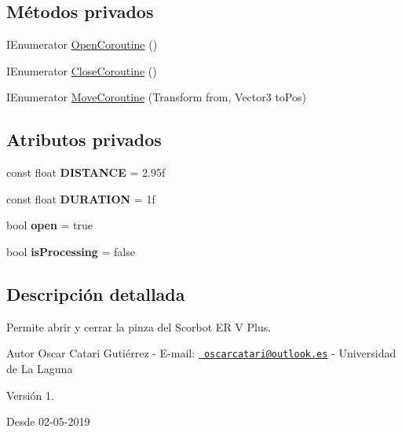 \subsection*{Métodos privados}
\begin{DoxyCompactItemize}
\item 
I\+Enumerator \mbox{\hyperlink{class_grip_scorbot_e_r_v_plus_a80dc2479b382451c0a41893e64287382}{Open\+Coroutine}} ()
\item 
I\+Enumerator \mbox{\hyperlink{class_grip_scorbot_e_r_v_plus_acc36be3cd433bc005835c85aa9c6aa8f}{Close\+Coroutine}} ()
\item 
I\+Enumerator \mbox{\hyperlink{class_grip_scorbot_e_r_v_plus_aa15864ac05d2aaa60844cb715def5b35}{Move\+Coroutine}} (Transform from, Vector3 to\+Pos)
\end{DoxyCompactItemize}
\subsection*{Atributos privados}
\begin{DoxyCompactItemize}
\item 
\mbox{\label{class_grip_scorbot_e_r_v_plus_a4669b7e065bd3a55fed035eecdc0f7a8}} 
const float {\bfseries D\+I\+S\+T\+A\+N\+CE} = 2.\+95f
\item 
\mbox{\label{class_grip_scorbot_e_r_v_plus_a6a4ad71a31f63313d466f9c5d2b57108}} 
const float {\bfseries D\+U\+R\+A\+T\+I\+ON} = 1f
\item 
\mbox{\label{class_grip_scorbot_e_r_v_plus_aa6e923c5df19200ce3935ad8ead89547}} 
bool {\bfseries open} = true
\item 
\mbox{\label{class_grip_scorbot_e_r_v_plus_ad1c090ff1a691904389e10fe03446cbd}} 
bool {\bfseries is\+Processing} = false
\end{DoxyCompactItemize}


\subsection{Descripción detallada}
Permite abrir y cerrar la pinza del Scorbot ER V Plus. \begin{DoxyAuthor}{Autor}
Oscar Catari Gutiérrez -\/ E-\/mail\+: \href{mailto:oscarcatari@outlook.es}{\texttt{ oscarcatari@outlook.\+es}} -\/ Universidad de La Laguna 
\end{DoxyAuthor}
\begin{DoxyVersion}{Versión}
1. 
\end{DoxyVersion}
\begin{DoxySince}{Desde}
02-\/05-\/2019 
\end{DoxySince}


